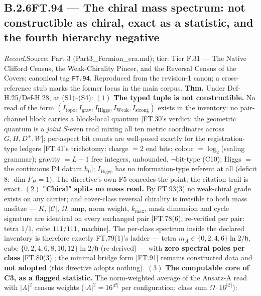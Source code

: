 \documentclass[11pt,openany]{report}
\theoremstyle{canonplain}
\theoremstyle{canondef}
\begin{document}
\subsection*{\texorpdfstring{B.2.6\quad FT.94 — The chiral mass spectrum: not constructible as chiral, exact as a statistic, and the fourth hierarchy negative}{FT.94 B.2.6}}
\label{tag:FT-94}
{\small \textit{Record.}\quad Source: Part 3 (Part3\_Fermion\_era.md); tier: Tier F.31 — The Native Clifford Census, the Weak-Chirality Pincer, and the Reversal Census of the Covers; canonical tag \texttt{FT.94}. Reproduced from the revision-1 canon; a cross-reference stub marks the former locus in the main corpus.}
\medskip
\textbf{Thm.} Under Def-H.25/Def-H.28, at (S1)–(S4): $(1)$ \textbf{The typed tuple is not constructible.} No read of the form $(I_{\mathrm{topo}},I_{\mathrm{grav}},I_{\mathrm{Higgs}},I_{\mathrm{Weak}},I_{\mathrm{strong}})$ exists in the inventory: no pair-channel block carries a block-local quantum [FT.30's verdict: the geometric quantum is a \textit{joint} $S$-even read mixing all ten metric coordinates across $G,H,D^+,W$]; per-aspect bit counts are well-posed exactly for the registration-type ledgers [FT.41's trichotomy: charge $=2$ end bits; colour $=\log_2$(sealing grammar); gravity $=L{-}1$ free integers, unbounded, $\neg$bit-type (C10); Higgs $=$ the continuous P4 datum $h_0$]; $I_{\mathrm{Higgs}}$ has no information-type referent at all (deficit 8: $\dim F_H=1$). The directive's own F5 concedes the point; the citation trail is exact. $(2)$ \textbf{"Chiral" splits no mass read.} By FT.93(3) no weak-chiral grade exists on any carrier; and cover-class reversal chirality is invisible to both mass ansätze — $K$, $|\mathcal C|$, $\Omega$, amp, norm weight, $k_{\max}$, mask dimension and cycle signature are identical on every exchanged pair [FT.78(6), re-verified per pair: tetra $1/1$, cube $111/111$, machine]. The per-class spectrum inside the declared inventory is therefore exactly FT.79(1)'s ladder — tetra $m_A\in\{0,2,4,6\}\ln2/\mathfrak h$, cube $\{0,2,4,6,8,10,12\}\ln2/\mathfrak h$ (re-derived) — with \textbf{zero spectral poles per class} [FT.80(3)]; the minimal bridge form [FT.91] remains constructed data and \textbf{not adopted} (this directive adopts nothing). $(3)$ \textbf{The computable core of C3, as a flagged statistic.} The norm-weighted average of the Ansatz-A read with $|A|^2$ census weights ($|A|^2=16^{|\mathcal C|}$ per configuration; class sum $\Omega\cdot16^{|\mathcal C|}$):
\end{document}
